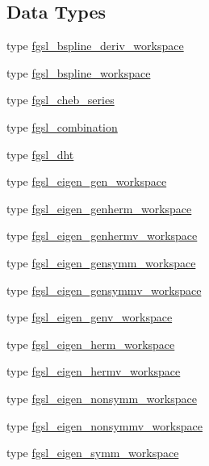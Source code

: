 \subsection*{Data Types}
\begin{DoxyCompactItemize}
\item 
type \hyperlink{structfgsl_1_1fgsl__bspline__deriv__workspace}{fgsl\-\_\-bspline\-\_\-deriv\-\_\-workspace}
\item 
type \hyperlink{structfgsl_1_1fgsl__bspline__workspace}{fgsl\-\_\-bspline\-\_\-workspace}
\item 
type \hyperlink{structfgsl_1_1fgsl__cheb__series}{fgsl\-\_\-cheb\-\_\-series}
\item 
type \hyperlink{structfgsl_1_1fgsl__combination}{fgsl\-\_\-combination}
\item 
type \hyperlink{structfgsl_1_1fgsl__dht}{fgsl\-\_\-dht}
\item 
type \hyperlink{structfgsl_1_1fgsl__eigen__gen__workspace}{fgsl\-\_\-eigen\-\_\-gen\-\_\-workspace}
\item 
type \hyperlink{structfgsl_1_1fgsl__eigen__genherm__workspace}{fgsl\-\_\-eigen\-\_\-genherm\-\_\-workspace}
\item 
type \hyperlink{structfgsl_1_1fgsl__eigen__genhermv__workspace}{fgsl\-\_\-eigen\-\_\-genhermv\-\_\-workspace}
\item 
type \hyperlink{structfgsl_1_1fgsl__eigen__gensymm__workspace}{fgsl\-\_\-eigen\-\_\-gensymm\-\_\-workspace}
\item 
type \hyperlink{structfgsl_1_1fgsl__eigen__gensymmv__workspace}{fgsl\-\_\-eigen\-\_\-gensymmv\-\_\-workspace}
\item 
type \hyperlink{structfgsl_1_1fgsl__eigen__genv__workspace}{fgsl\-\_\-eigen\-\_\-genv\-\_\-workspace}
\item 
type \hyperlink{structfgsl_1_1fgsl__eigen__herm__workspace}{fgsl\-\_\-eigen\-\_\-herm\-\_\-workspace}
\item 
type \hyperlink{structfgsl_1_1fgsl__eigen__hermv__workspace}{fgsl\-\_\-eigen\-\_\-hermv\-\_\-workspace}
\item 
type \hyperlink{structfgsl_1_1fgsl__eigen__nonsymm__workspace}{fgsl\-\_\-eigen\-\_\-nonsymm\-\_\-workspace}
\item 
type \hyperlink{structfgsl_1_1fgsl__eigen__nonsymmv__workspace}{fgsl\-\_\-eigen\-\_\-nonsymmv\-\_\-workspace}
\item 
type \hyperlink{structfgsl_1_1fgsl__eigen__symm__workspace}{fgsl\-\_\-eigen\-\_\-symm\-\_\-workspace}
\item 

\end{DoxyCompactItemize}
